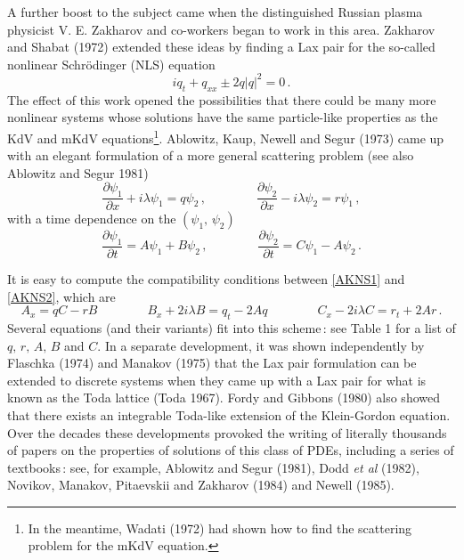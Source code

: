 \documentclass[11pt]{article}
\newcommand{\rem}[1]{}
\newcommand{\bel}{\begin{equation}\label}
\newcommand{\ee}{\end{equation}}
\newcommand{\bpsi}{\boldsymbol{\psi}}
\begin{document}
A further boost to the subject came when the distinguished Russian plasma physicist V. E. Zakharov and co-workers began 
to work in this area. Zakharov and Shabat (1972) extended these ideas by finding a Lax pair for the so-called nonlinear 
Schr\"odinger (NLS) equation 
\bel{NLS1}
iq_{t} + q_{xx} \pm 2q|q|^{2} = 0 \,.
\ee
The effect of this work opened the possibilities that there could be many more nonlinear systems whose solutions have 
the same particle-like properties as the KdV and mKdV equations\footnote{In the meantime, Wadati (1972) had shown how 
to find the scattering problem for the mKdV equation.}. Ablowitz, Kaup, Newell and Segur (1973) came up with an elegant formulation of a more general scattering problem (see also Ablowitz and Segur 1981) 
\bel{AKNS1}
\frac{\partial\psi_{1}}{\partial x} + i\lambda\psi_{1} = q\psi_{2}\,,\qquad\qquad
\frac{\partial\psi_{2}}{\partial x} - i\lambda\psi_{2} = r\psi_{1}\,,
\ee
with a time dependence on the $(\psi_{1},\,\psi_{2})$
\bel{AKNS2}
\frac{\partial\psi_{1}}{\partial t} =  A\psi_{1} + B\psi_{2}\,,\qquad\qquad
\frac{\partial\psi_{2}}{\partial t} =  C\psi_{1} - A\psi_{2}\,.
\ee
\rem{This is like a factorization of the 2-channel Schr\"odinger system $\bpsi = (\psi_{1},\,\psi_{2})$
\bel{AKNS2}
\left( - \frac{\partial^{2}~}{\partial x^2} + \mathbf{V}\right)\bpsi = \lambda^{2}\bpsi 
\qquad\qquad 
\mathbf{V} = \left(
\begin{array}{cc}
qr & q_{x}\\
r_{x} & qr
\end{array}
\right)
\ee}
It is easy to compute the compatibility conditions between \eqref{AKNS1} and \eqref{AKNS2}, which are 
\bel{AKNS3}
A_{x} = qC - rB\qquad\qquad B_{x} +2i\lambda B = q_{t} - 2Aq \qquad\qquad C_{x} - 2i\lambda C = r_{t} + 2Ar\,.
\ee
Several equations (and their variants) fit into this scheme\,: see Table 1 for a list of $q,\,r,\,A,\,B$ and $C$. 
In a separate development, it was shown independently by Flaschka (1974) and Manakov (1975) that the Lax pair formulation can be extended to discrete systems when they came up with a Lax pair for what is known as the Toda lattice (Toda 1967). Fordy and Gibbons (1980) also showed that there exists an integrable Toda-like extension of the Klein-Gordon equation. Over the decades these developments provoked the writing of literally thousands of papers on the properties of solutions of this class of PDEs, including a series of textbooks\,: see, for example, Ablowitz and Segur (1981), Dodd \textit{et al} (1982), Novikov, Manakov, Pitaevskii and Zakharov (1984) and Newell (1985).
\end{document}
